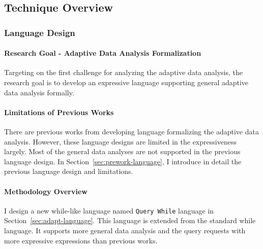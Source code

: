 %
\subsection{Technique Overview}
\label{sec:adapt-intro-overview}

\subsubsection{Language Design}
\paragraph*{Research Goal - Adaptive Data Analysis Formalization}
Targeting on the first challenge
for analyzing the adaptive data analysis, 
the research goal is to develop
an expressive language supporting general adaptive data analysis formally.

\paragraph*{Limitations of Previous Works}
There are previous works from  developing language formalizing the adaptive data analysis.
However, these language designs are limited in the expressiveness largely.
Most of the general data analyses are not supported in the previous language design.
In Section~\ref{sec:prework-language}, I introduce in detail the previous language design and limitations.
%
\paragraph*{Methodology Overview}
I design a new while-like language 
named {\tt Query While} language in Section~\ref{sec:adapt-language}.
This language is extended from the standard while language.
It supports more general data analysis and the query requests with more expressive expressions than previous works.

